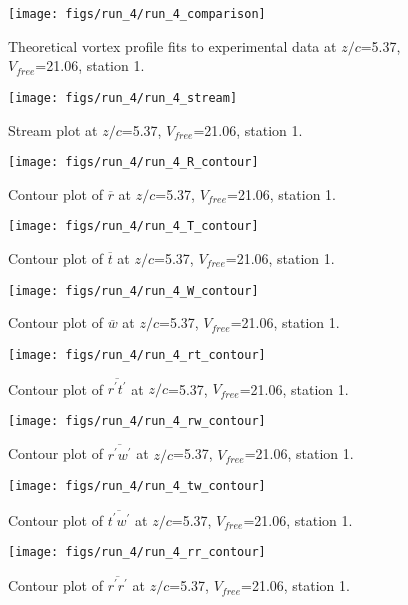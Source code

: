 \begin{figure}[H]
\centering
\texttt{[image: figs/run\_4/run\_4\_comparison]}
\caption{Theoretical vortex profile fits to experimental data at $z/c$=5.37, $V_{free}$=21.06, station 1.}
\end{figure}


\begin{figure}[H]
\centering
\texttt{[image: figs/run\_4/run\_4\_stream]}
\caption{Stream plot at $z/c$=5.37, $V_{free}$=21.06, station 1.}
\end{figure}


\begin{figure}[H]
\centering
\texttt{[image: figs/run\_4/run\_4\_R\_contour]}
\caption{Contour plot of $\overline{r}$ at $z/c$=5.37, $V_{free}$=21.06, station 1.}
\end{figure}


\begin{figure}[H]
\centering
\texttt{[image: figs/run\_4/run\_4\_T\_contour]}
\caption{Contour plot of $\overline{t}$ at $z/c$=5.37, $V_{free}$=21.06, station 1.}
\end{figure}


\begin{figure}[H]
\centering
\texttt{[image: figs/run\_4/run\_4\_W\_contour]}
\caption{Contour plot of $\overline{w}$ at $z/c$=5.37, $V_{free}$=21.06, station 1.}
\end{figure}


\begin{figure}[H]
\centering
\texttt{[image: figs/run\_4/run\_4\_rt\_contour]}
\caption{Contour plot of $\overline{r^\prime t^\prime}$ at $z/c$=5.37, $V_{free}$=21.06, station 1.}
\end{figure}


\begin{figure}[H]
\centering
\texttt{[image: figs/run\_4/run\_4\_rw\_contour]}
\caption{Contour plot of $\overline{r^\prime w^\prime}$ at $z/c$=5.37, $V_{free}$=21.06, station 1.}
\end{figure}


\begin{figure}[H]
\centering
\texttt{[image: figs/run\_4/run\_4\_tw\_contour]}
\caption{Contour plot of $\overline{t^\prime w^\prime}$ at $z/c$=5.37, $V_{free}$=21.06, station 1.}
\end{figure}


\begin{figure}[H]
\centering
\texttt{[image: figs/run\_4/run\_4\_rr\_contour]}
\caption{Contour plot of $\overline{r^\prime r^\prime}$ at $z/c$=5.37, $V_{free}$=21.06, station 1.}
\end{figure}



